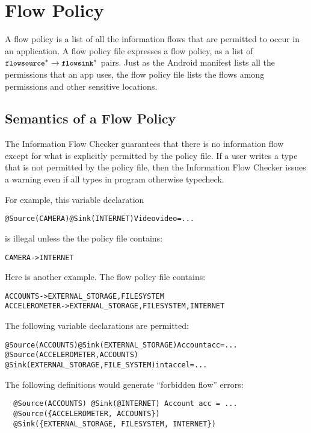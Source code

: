 


\section{Flow Policy\label{sec:flow-policy}}

A flow policy is a list of all the information flows that are permitted to occur
in an application.
A flow policy file expresses a flow policy, as a list of $\flow{\|flowsource|^*}{\|flowsink|^*}$ pairs.
Just as the Android manifest lists all the permissions that an app uses,
the flow policy file lists the flows among permissions and other sensitive 
locations. 

\subsection{Semantics of a Flow Policy}
\label{sec:undsiredflows}
The Information Flow Checker guarantees that there is no information
flow except for what is explicitly permitted by the policy file. If a user writes a type that is
not permitted by the policy file, then the Information Flow Checker issues a warning
even if all types in program otherwise typecheck.

For example, this variable declaration

\begin{alltt}
@Source(CAMERA) @Sink(INTERNET) Video video = ...
\end{alltt}

\noindent
is illegal unless the the policy file contains:

\begin{alltt}
CAMERA -> INTERNET
\end{alltt}

Here is another example.
The flow policy file contains:
\begin{alltt}
  ACCOUNTS      -> EXTERNAL_STORAGE, FILESYSTEM
  ACCELEROMETER -> EXTERNAL_STORAGE, FILESYSTEM, INTERNET
\end{alltt}

The following variable declarations are permitted:
\begin{alltt}
  @Source(ACCOUNTS) @Sink(EXTERNAL_STORAGE) Account acc = ...
  @Source({ACCELEROMETER, ACCOUNTS})
  @Sink({EXTERNAL_STORAGE, FILE_SYSTEM}) int accel = ...
\end{alltt}

The following definitions would generate ``forbidden flow'' errors:
\begin{Verbatim}
  @Source(ACCOUNTS) @Sink(@INTERNET) Account acc = ...
  @Source({ACCELEROMETER, ACCOUNTS})
  @Sink({EXTERNAL_STORAGE, FILESYSTEM, INTERNET})
\end{Verbatim}

